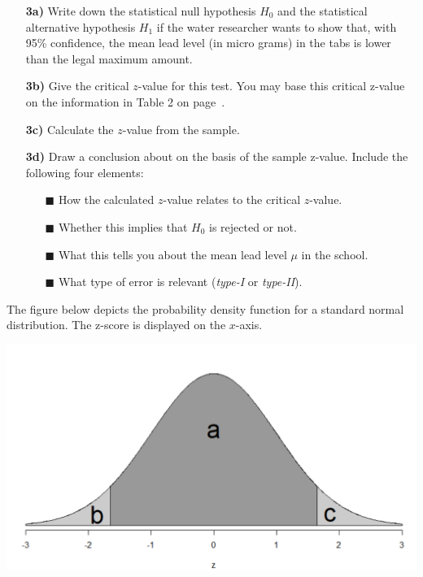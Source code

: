 \begin{itemize}


    \item[\textbf{3a)}] Write down the statistical null hypothesis $H_0$ and the statistical alternative hypothesis $H_1$ if the water researcher wants to show that, with 95\% confidence, the mean lead level (in micro grams) in the tabs is lower than the legal maximum amount.
    
    \item[\textbf{3b)}] Give the critical $z$-value for this test. You may base this critical z-value on the information in Table 2 on page~\pageref{table2}.

    \item[\textbf{3c)}] Calculate the $z$-value from the sample.
    
    \item[\textbf{3d)}] Draw a conclusion about  on the basis of the sample z-value. Include the following four elements: 
    \begin{itemize}
        \item[$\blacksquare$] How the calculated $z$-value relates to the critical $z$-value.
        \item[$\blacksquare$] Whether this implies that $H_0$ is rejected or not.
        \item[$\blacksquare$] What this tells you about the mean lead level $\mu$ in the school.
        \item[$\blacksquare$] What type of error is relevant (\textit{type-I} or \textit{type-II}).
    \end{itemize}

\end{itemize}
    
    The figure below depicts the probability density function for a standard normal distribution. The z-score is displayed on the $x$-axis. \\
    \begin{center}
        \includegraphics[width=.8\textwidth]{Files/Images/normalDistExam.png}
    \end{center}
    

